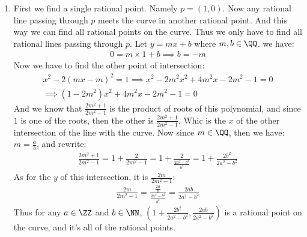 \begin{enumerate}[label=]
    \item 
        First we find a single rational point. Namely $p = (1, 0)$. Now any rational line passing through $p$ meets the curve in another rational point. And this way we can find all rational points on the curve. Thus we only have to find all rational lines passing through $p$. Let $y = mx + b$ where $m, b \in \QQ$. we have:
        \begin{gather*}
            0 = m \times 1 + b \implies b = -m
        \end{gather*}
        Now we have to find the other point of intersection:
        \begin{gather*}
            x^2 - 2(mx - m)^2 = 1 \implies x^2 - 2m^2 x^2 + 4m^2 x - 2m^2 - 1= 0 \\
            \implies (1 - 2m^2) x^2 + 4m^2 x - 2m^2 - 1 = 0
        \end{gather*}
        And we know that $\frac{2m^2 + 1}{2m^2 - 1}$ is the product of roots of this polynomial, and since $1$ is one of the roots, then the other is $\frac{2m^2 + 1}{2m^2 - 1}$. Whic is the $x$ of the other intersection of the line with the curve. Now since $m \in \QQ$, then we have: $m = \frac{a}{b}$, and rewrite:
        \begin{gather*}
            \frac{2m^2 + 1}{2m^2 - 1} = 1 + \frac{2}{2m^2 - 1} = 1 + \frac{2}{\frac{2a^2 - b^2}{b^2}} = 1 + \frac{2b^2 }{2a^2 - b^2}
        \end{gather*}
        As for the $y$ of this intersection, it is $\frac{2m}{2m^2 - 1}$:
        \begin{gather*}
            \frac{2m}{2m^2 - 1} = \frac{\frac{2a}{b}}{\frac{2a^2 - b^2}{b^2}} = \frac{2ab}{2a^2 - b^2}
        \end{gather*}
        Thus for any $a \in \ZZ$ and $b \in \NN$, $(1 + \frac{2b^2}{2a^2 - b^2}, \frac{2ab}{2a^2 - b^2})$ is a rational point on the curve, and it's all of the rational points.
\end{enumerate}